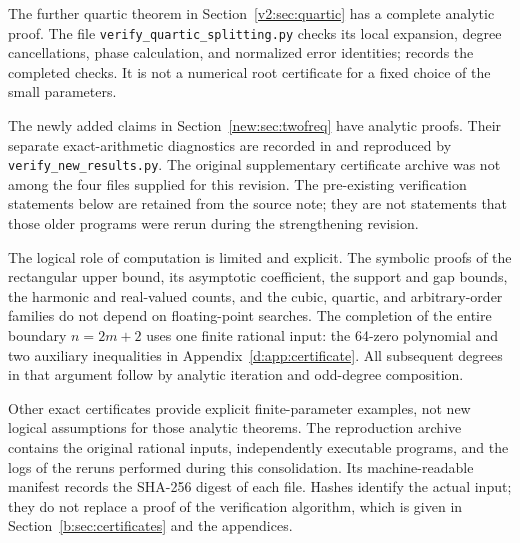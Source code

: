 \documentclass[UTF8,11pt]{ctexart}
\theoremstyle{definition}
\numberwithin{equation}{section}
\begin{document}
\begingroup\raggedright
The further quartic theorem in Section~\ref{v2:sec:quartic} has a
complete analytic proof. The file \texttt{verify\_quartic\_splitting.py}
checks its local expansion, degree cancellations, phase calculation, and
normalized error identities; 
records the completed checks. It is not a numerical root certificate
for a fixed choice of the small parameters.

The newly added claims in Section~\ref{new:sec:twofreq} have analytic
proofs. Their separate exact-arithmetic diagnostics are recorded in
 and reproduced by
\texttt{verify\_new\_results.py}. The original supplementary certificate
archive was not among the four files supplied for this revision.
The pre-existing verification statements below are retained from the
source note; they are not statements that those older programs were
rerun during the strengthening revision.\par\endgroup


The logical role of computation is limited and explicit. The symbolic
proofs of the rectangular upper bound, its asymptotic coefficient, the
support and gap bounds, the harmonic and real-valued counts, and the
cubic, quartic, and arbitrary-order families do not depend on floating-point searches. The completion of
the entire boundary $n=2m+2$ uses one finite rational input: the 64-zero
polynomial and two auxiliary inequalities in
Appendix~\ref{d:app:certificate}. All subsequent degrees in that argument
follow by analytic iteration and odd-degree composition.

Other exact certificates provide explicit finite-parameter examples, not
new logical assumptions for those analytic theorems. The reproduction
archive contains the original rational inputs, independently executable
programs, and the logs of the reruns performed during this consolidation.
Its machine-readable manifest records the SHA-256 digest of each file.
Hashes identify the actual input; they do not replace a proof of the
verification algorithm, which is given in Section~\ref{b:sec:certificates}
and the appendices.
\end{document}
